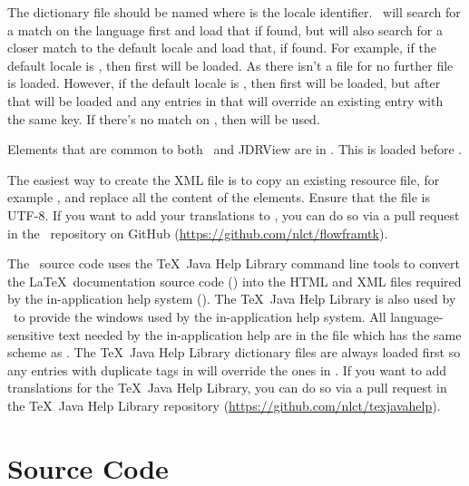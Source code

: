 The dictionary file should be named
where  is the locale identifier.
\FlowframTk\ will search for a match on the language first
and load that if found, but will also search for a closer match to
the default locale and load that, if found. For example,
if the default locale is , then first
 will be loaded. As there isn't a file
for  no further file is loaded.
However, if the default locale is , then first
 will be loaded, but after that
 will be loaded and any entries in
that will override an existing entry with the same key.
If there's no match on , then 
 will be used.

Elements that are common to both \FlowframTk\ and JDRView 
are in . This is loaded before
.

The easiest way to create the XML file is to copy an existing
resource file, for example , and replace
all the content of the  elements. Ensure that the file
is UTF-8. If you want to add your translations to \FlowframTk, you
can do so via a pull request in the \FlowframTk\ repository on
GitHub (\url{https://github.com/nlct/flowframtk}).

The \FlowframTk\ source code uses the \TeX\ Java Help Library
command line tools to convert the \LaTeX\ documentation source code
() into the HTML and XML files required by
the in-application help system (). The
\TeX\ Java Help Library is also used by \FlowframTk\ to provide the
windows used by the in-application help system. All
language-sensitive text needed by the in-application help are
in the file  which has
the same scheme as .
The \TeX\ Java Help Library dictionary files are always loaded first
so any entries with duplicate tags in 
will override the ones in  .
If you want to add translations for the \TeX\ Java Help Library,
you can do so via a pull request in the \TeX\ Java Help Library
repository (\url{https://github.com/nlct/texjavahelp}).


\chapter{Source Code}\label{sec:sourcecode}

